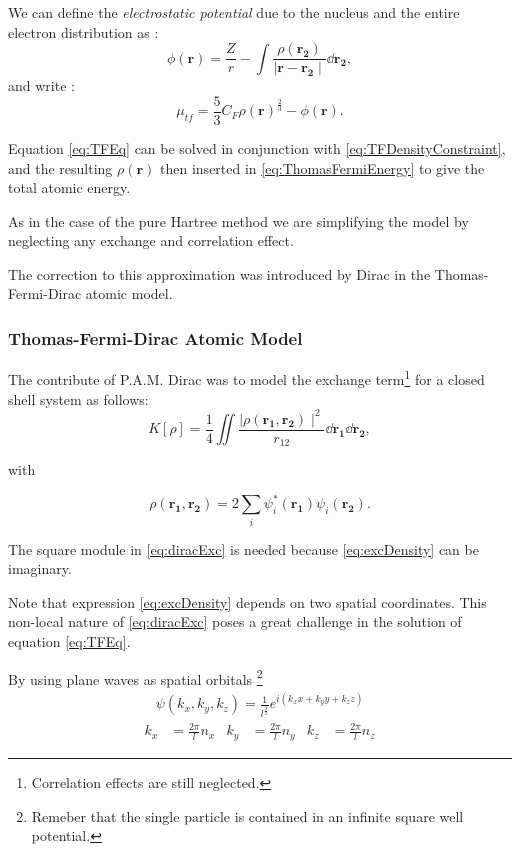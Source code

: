 \documentclass[a4paper,12pt]{article}
\begin{document}
We can define the \textit{electrostatic potential} due to the nucleus and the entire electron distribution as :
\begin{equation}
	\phi(\mathbf{r}) = \frac{Z}{r} - \int \frac{\rho(\mathbf{r_2})}{\mid \mathbf{r} - \mathbf{r_2} \mid} \dd{\mathbf{r_2}},
\end{equation}
and write :
\begin{equation}
\mu_{tf} = \frac{5}{3} C_{F} \rho(\mathbf{r})^{\frac{2}{3}} - \phi(\mathbf{r}).
\end{equation}


Equation \eqref{eq:TFEq} can be solved in conjunction with \eqref{eq:TFDensityConstraint}, and the resulting $\rho(\mathbf{r})$ then inserted in \eqref{eq:ThomasFermiEnergy} to give the total atomic energy.

As in the case of the pure Hartree method we are simplifying the model by neglecting any exchange and correlation effect. 

The correction to this approximation was introduced by Dirac in the Thomas-Fermi-Dirac atomic model.



\subsubsection{Thomas-Fermi-Dirac Atomic Model}

The contribute of P.A.M. Dirac was to model the exchange term\footnote{Correlation effects are still neglected.} for a closed shell system as follows:
\begin{equation}\label{eq:diracExc}
	K[\rho] = \frac{1}{4} \iint \frac{\mid \rho(\mathbf{r_1},\mathbf{r_2})\mid^2 }{r_{12}} \dd{\mathbf{r_1}} \dd{\mathbf{r_2}},
\end{equation}

with

\begin{equation} \label{eq:excDensity}
	\rho(\mathbf{r_1},\mathbf{r_2}) 
	= 2 \sum_i 
	\psi_{i}^{*}
	(\mathbf{r_1}) 
	\psi_{i}
	(\mathbf{r_2}).
\end{equation}

The square module in \eqref{eq:diracExc} is needed because \eqref{eq:excDensity} can be imaginary.

Note that expression \eqref{eq:excDensity} depends on two spatial coordinates.
This non-local nature of \eqref{eq:diracExc} poses a great challenge in the solution of equation \eqref{eq:TFEq}.

By using plane waves as spatial orbitals \footnote{Remeber that the single particle is contained in an infinite square well potential.} 
\begin{align}
	\psi(k_x,k_y,k_z) = \frac{1}{l^{\frac{3}{2}}} e^{i(k_x x + k_y y + k_z z)}
\end{align}
\begin{align}
		k_x & =\frac{2\pi}{l} n_x & k_y & =\frac{2\pi}{l} n_y & k_z & =\frac{2\pi}{l} n_z
\end{align}
\end{document}
